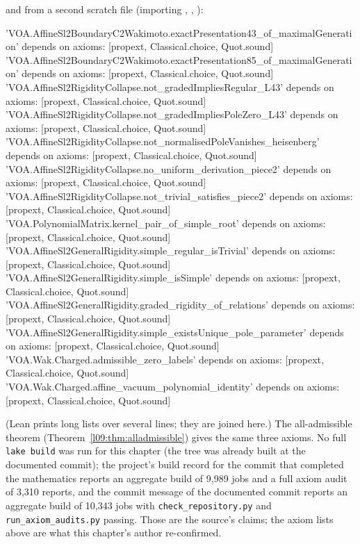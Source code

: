 and from a second scratch file (importing ,
, ):

\begin{plaincode}
'VOA.AffineSl2BoundaryC2Wakimoto.exactPresentation43_of_maximalGeneration' depends on axioms: [propext, Classical.choice, Quot.sound]
'VOA.AffineSl2BoundaryC2Wakimoto.exactPresentation85_of_maximalGeneration' depends on axioms: [propext, Classical.choice, Quot.sound]
'VOA.AffineSl2RigidityCollapse.not_gradedImpliesRegular_L43' depends on axioms: [propext, Classical.choice, Quot.sound]
'VOA.AffineSl2RigidityCollapse.not_gradedImpliesPoleZero_L43' depends on axioms: [propext, Classical.choice, Quot.sound]
'VOA.AffineSl2RigidityCollapse.not_normalisedPoleVanishes_heisenberg' depends on axioms: [propext, Classical.choice, Quot.sound]
'VOA.AffineSl2RigidityCollapse.no_uniform_derivation_piece2' depends on axioms: [propext, Classical.choice, Quot.sound]
'VOA.AffineSl2RigidityCollapse.not_trivial_satisfies_piece2' depends on axioms: [propext, Classical.choice, Quot.sound]
'VOA.PolynomialMatrix.kernel_pair_of_simple_root' depends on axioms: [propext, Classical.choice, Quot.sound]
'VOA.AffineSl2GeneralRigidity.simple_regular_isTrivial' depends on axioms: [propext, Classical.choice, Quot.sound]
'VOA.AffineSl2GeneralRigidity.simple_isSimple' depends on axioms: [propext, Classical.choice, Quot.sound]
'VOA.AffineSl2GeneralRigidity.graded_rigidity_of_relations' depends on axioms: [propext, Classical.choice, Quot.sound]
'VOA.AffineSl2GeneralRigidity.simple_existsUnique_pole_parameter' depends on axioms: [propext, Classical.choice, Quot.sound]
'VOA.Wak.Charged.admissible_zero_labels' depends on axioms: [propext, Classical.choice, Quot.sound]
'VOA.Wak.Charged.affine_vacuum_polynomial_identity' depends on axioms: [propext, Classical.choice, Quot.sound]
\end{plaincode}

(Lean prints long lists over several lines; they are joined here.) The all-admissible theorem (Theorem~\ref{l09:thm:alladmissible}) gives the same three axioms. No full
\texttt{lake build} was run for this chapter (the tree was already built at the documented commit);
the project's build record for the commit that completed the mathematics reports an
aggregate build of 9{,}989 jobs and a full axiom audit of 3{,}310 reports, and the commit message of
the documented commit reports an aggregate build of 10{,}343 jobs with \texttt{check\_repository.py} and
\texttt{run\_axiom\_audits.py} passing. Those are the source's claims; the axiom lists above are what
this chapter's author re-confirmed.

